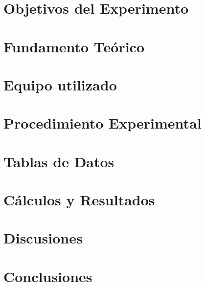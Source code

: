 \documentclass[12pt,a4paper]{article}
\begin{document}

\pagestyle{fancy}
\fancyfoot{}
\fancyfoot[R]{\textit{\thepage}}
\tableofcontents

\newpage
\section{Objetivos del Experimento} %

\section{Fundamento Teórico} %

\section{Equipo utilizado} %

\section{Procedimiento Experimental} %

\section{Tablas de Datos} %

\section{Cálculos y Resultados} %

\section{Discusiones} %

\section{Conclusiones} %

\end{document}
